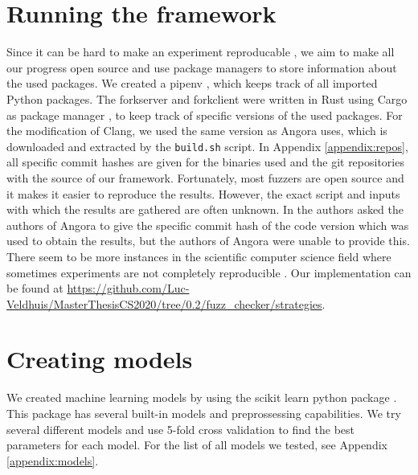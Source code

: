 \section{Running the framework}
Since it can be hard to make an experiment reproducable \cite{van2018benchmarking}, we aim to make all our progress open source and use package managers to store information about the used packages.
We created a pipenv \cite{reitz2020pipenv}, which keeps track of all imported Python packages. The forkserver and forkclient were written in Rust using Cargo as package manager \cite{cargo}, to keep track of specific versions of the used packages. For the modification of Clang, we used the same version as Angora uses, which is downloaded and extracted by the \texttt{build.sh} script. In Appendix \ref{appendix:repos}, all specific commit hashes are given for the binaries used and the git repositories with the source of our framework. Fortunately, most fuzzers are open source and it makes it easier to reproduce the results. However, the exact script and inputs with which the results are gathered are often unknown. In \cite{angora2020blogpost} the authors asked the authors of Angora to give the specific commit hash of the code version which was used to obtain the results, but the authors of Angora were unable to provide this. There seem to be more instances in the scientific computer science field where sometimes experiments are not completely reproducible \cite{collberg2016repeatability}.
Our implementation can be found at \url{https://github.com/Luc-Veldhuis/MasterThesisCS2020/tree/0.2/fuzz_checker/strategies}.

\section{Creating models}
We created machine learning models by using the scikit learn python package \cite{scikit-learn}. This package has several built-in models and preprossessing capabilities. We try several different models and use 5-fold cross validation to find the best parameters for each model. For the list of all models we tested, see Appendix \ref{appendix:models}.

